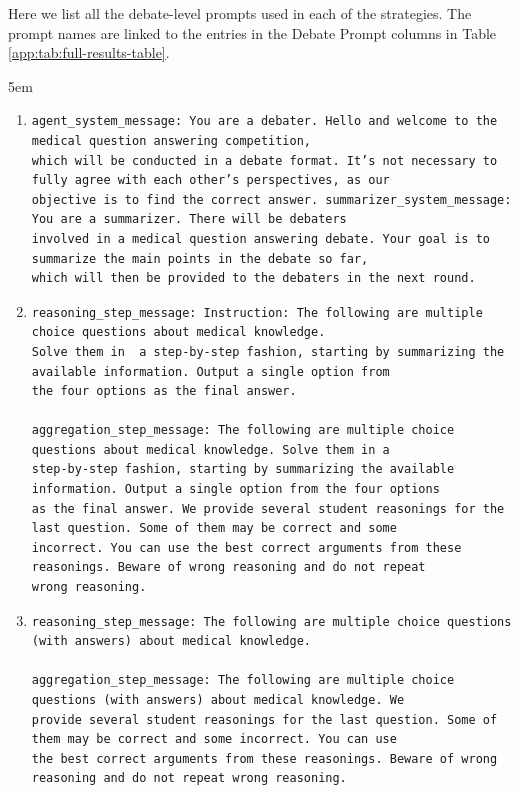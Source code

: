 Here we list all the debate-level prompts used in each of the strategies. The prompt names are linked to the entries in the \newline Debate Prompt columns in Table \ref{app:tab:full-results-table}.


\tiny
\begin{adjustwidth}{5em}{}
\begin{enumerate}
\item[CE MAD:]

\begin{verbatim}
agent_system_message: You are a debater. Hello and welcome to the medical question answering competition,   
which will be conducted in a debate format. It’s not necessary to fully agree with each other’s perspectives, as our  
objective is to find the correct answer. summarizer_system_message: You are a summarizer. There will be debaters 
involved in a medical question answering debate. Your goal is to summarize the main points in the debate so far,  
which will then be provided to the debaters in the next round.
\end{verbatim}


\item[ER MAD CoT:]
\begin{verbatim}
reasoning_step_message: Instruction: The following are multiple choice questions about medical knowledge. 
Solve them in  a step-by-step fashion, starting by summarizing the available information. Output a single option from  
the four options as the final answer.

aggregation_step_message: The following are multiple choice questions about medical knowledge. Solve them in a 
step-by-step fashion, starting by summarizing the available information. Output a single option from the four options 
as the final answer. We provide several student reasonings for the last question. Some of them may be correct and some 
incorrect. You can use the best correct arguments from these reasonings. Beware of wrong reasoning and do not repeat 
wrong reasoning.
\end{verbatim}

\item[ER MAD:]
\begin{verbatim}
reasoning_step_message: The following are multiple choice questions (with answers) about medical knowledge.

aggregation_step_message: The following are multiple choice questions (with answers) about medical knowledge. We
provide several student reasonings for the last question. Some of them may be correct and some incorrect. You can use 
the best correct arguments from these reasonings. Beware of wrong reasoning and do not repeat wrong reasoning.
\end{verbatim}


\end{enumerate}
\end{adjustwidth}
